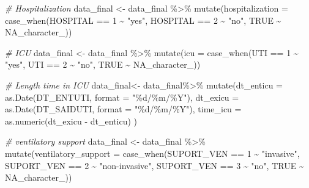 \documentclass[
]{article}
\newenvironment{Shaded}{\begin{snugshade}}{\end{snugshade}}
\newcommand{\AttributeTok}[1]{\textcolor[rgb]{0.77,0.63,0.00}{#1}}
\newcommand{\CommentTok}[1]{\textcolor[rgb]{0.56,0.35,0.01}{\textit{#1}}}
\newcommand{\ConstantTok}[1]{\textcolor[rgb]{0.00,0.00,0.00}{#1}}
\newcommand{\DecValTok}[1]{\textcolor[rgb]{0.00,0.00,0.81}{#1}}
\newcommand{\FunctionTok}[1]{\textcolor[rgb]{0.00,0.00,0.00}{#1}}
\newcommand{\NormalTok}[1]{#1}
\newcommand{\OtherTok}[1]{\textcolor[rgb]{0.56,0.35,0.01}{#1}}
\newcommand{\SpecialCharTok}[1]{\textcolor[rgb]{0.00,0.00,0.00}{#1}}
\newcommand{\StringTok}[1]{\textcolor[rgb]{0.31,0.60,0.02}{#1}}
\begin{document}
\begin{Shaded}
\begin{Highlighting}[]
\CommentTok{\# Hospitalization}
\NormalTok{data\_final }\OtherTok{\textless{}{-}}\NormalTok{ data\_final }\SpecialCharTok{\%\textgreater{}\%}
  \FunctionTok{mutate}\NormalTok{(}\AttributeTok{hospitalization =} \FunctionTok{case\_when}\NormalTok{(HOSPITAL }\SpecialCharTok{==} \DecValTok{1} \SpecialCharTok{\textasciitilde{}} \StringTok{"yes"}\NormalTok{,}
\NormalTok{                         HOSPITAL }\SpecialCharTok{==} \DecValTok{2} \SpecialCharTok{\textasciitilde{}} \StringTok{"no"}\NormalTok{,}
                         \ConstantTok{TRUE} \SpecialCharTok{\textasciitilde{}} \ConstantTok{NA\_character\_}\NormalTok{))}

\CommentTok{\# ICU}
\NormalTok{data\_final }\OtherTok{\textless{}{-}}\NormalTok{ data\_final }\SpecialCharTok{\%\textgreater{}\%}
  \FunctionTok{mutate}\NormalTok{(}\AttributeTok{icu =} \FunctionTok{case\_when}\NormalTok{(UTI }\SpecialCharTok{==} \DecValTok{1} \SpecialCharTok{\textasciitilde{}} \StringTok{"yes"}\NormalTok{,}
\NormalTok{                         UTI }\SpecialCharTok{==} \DecValTok{2} \SpecialCharTok{\textasciitilde{}} \StringTok{"no"}\NormalTok{,}
                         \ConstantTok{TRUE} \SpecialCharTok{\textasciitilde{}} \ConstantTok{NA\_character\_}\NormalTok{))}


\CommentTok{\# Length time in ICU}
\NormalTok{data\_final}\OtherTok{\textless{}{-}}\NormalTok{  data\_final}\SpecialCharTok{\%\textgreater{}\%} 
  \FunctionTok{mutate}\NormalTok{(}\AttributeTok{dt\_enticu  =} \FunctionTok{as.Date}\NormalTok{(DT\_ENTUTI,  }\AttributeTok{format =} \StringTok{"\%d/\%m/\%Y"}\NormalTok{),}
         \AttributeTok{dt\_exicu =} \FunctionTok{as.Date}\NormalTok{(DT\_SAIDUTI, }\AttributeTok{format =} \StringTok{"\%d/\%m/\%Y"}\NormalTok{), }
         \AttributeTok{time\_icu =} \FunctionTok{as.numeric}\NormalTok{(dt\_exicu }\SpecialCharTok{{-}}\NormalTok{ dt\_enticu)}
\NormalTok{  )}

\CommentTok{\# ventilatory support}
\NormalTok{data\_final }\OtherTok{\textless{}{-}}\NormalTok{ data\_final }\SpecialCharTok{\%\textgreater{}\%} 
  \FunctionTok{mutate}\NormalTok{(}\AttributeTok{ventilatory\_support =} \FunctionTok{case\_when}\NormalTok{(SUPORT\_VEN }\SpecialCharTok{==} \DecValTok{1} \SpecialCharTok{\textasciitilde{}} \StringTok{"invasive"}\NormalTok{,}
\NormalTok{                                SUPORT\_VEN }\SpecialCharTok{==} \DecValTok{2} \SpecialCharTok{\textasciitilde{}} \StringTok{"non{-}invasive"}\NormalTok{,}
\NormalTok{                                  SUPORT\_VEN }\SpecialCharTok{==} \DecValTok{3} \SpecialCharTok{\textasciitilde{}} \StringTok{"no"}\NormalTok{,}
                                \ConstantTok{TRUE} \SpecialCharTok{\textasciitilde{}} \ConstantTok{NA\_character\_}\NormalTok{))}


\end{Highlighting}
\end{Shaded}
\end{document}
